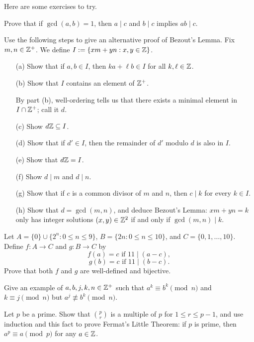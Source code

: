 \documentclass{article}
\begin{document}
Here are some exercises to try.
\begin{exercise}
Prove that if $\gcd(a,b) = 1$, then $a\mid c$ and $b\mid c$ implies $ab \mid c$.
\end{exercise}

\begin{exercise}
Use the following steps to give an alternative proof of Bezout's Lemma. Fix $m,n\in\mathbb Z^+$. We define $I:= \{xm + yn: x,y\in\mathbb Z\}$.
\begin{itemize}
    \item[(a)] Show that if $a,b\in I$, then $ka+\ell b\in I$ for all $k, \ell\in \mathbb Z$.
    \item[(b)] Show that $I$ contains an element of $\mathbb Z^+$.

    By part (b), well-ordering tells us that there exists a minimal element in $I\cap \mathbb Z^+$; call it $d$.
    \item[(c)] Show $d\mathbb Z\subseteq I$.
    \item[(d)] Show that if $d'\in I$, then the remainder of $d'$ modulo $d$ is also in $I$.
    \item[(e)] Show that $d\mathbb Z = I$.
    \item[(f)] Show $d\mid m$ and $d\mid n$.
    \item[(g)] Show that if $c$ is a common divisor of $m$ and $n$, then $c\mid k$ for every $k\in I$.
    \item[(h)] Show that $d = \gcd(m,n)$, and deduce Bezout's Lemma: $xm+yn = k$ only has integer solutions $(x,y)\in\mathbb Z^2$ if and only if $\gcd(m,n)\mid k$.
\end{itemize}
\end{exercise}
\begin{exercise}
Let $A = \{0\}\cup \{2^n: 0\leq n\leq 9\}$, $B = \{2n: 0\leq n \leq 10\}$, and $C = \{0, 1, \ldots, 10\}$. Define $f: A\to C$ and $g: B\to C$ by
$$f(a) = c \textrm{ if } 11\mid (a-c),$$
$$g(b) = c \textrm{ if } 11\mid (b-c).$$
Prove that both $f$ and $g$ are well-defined and bijective.
\end{exercise}
\begin{exercise}
Give an example of $a,b,j,k,n\in\mathbb Z^+$ such that $a^k \equiv b^k \pmod n$ and $k\equiv j\pmod n$ but $a^j\not\equiv b^k\pmod n$. 
\end{exercise}
\begin{exercise}
Let $p$ be a prime. Show that $\binom pr$ is a multiple of $p$ for $1\leq r \leq p-1$, and use induction and this fact to prove Fermat's Little Theorem: if $p$ is prime, then $a^p\equiv a \pmod p$ for any $a\in\mathbb Z$.
\end{exercise}
\end{document}
